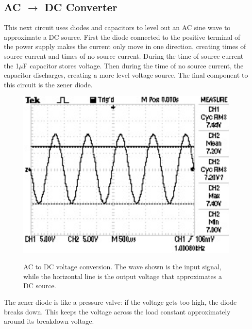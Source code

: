 \documentclass[twocolumn,english]{IEEEtran}
\begin{document}
\noindent\hrulefill
\subsection{\textbf{AC $\rightarrow$ DC Converter}}
This next circuit uses diodes and capacitors to level out an AC sine wave to approximate a DC source. First the diode connected to the positive terminal of the power supply makes the current only move in one direction, creating times of source current and times of no source current. During the time of source current the 1$\mu$F capacitor stores voltage. Then during the time of no source current, the capacitor discharges, creating a more level voltage source. The final component to this circuit is the zener diode.


\begin{figure}[h!]
  \begin{centering}
  \begin{center}
  \includegraphics[width=\linewidth]{./dcp.png}
  \label{fig:dcp}
  \caption{AC to DC voltage conversion. The wave shown is the input signal, while the horizontal line is the output voltage that approximates a DC source.}
  \end{center}
  \par\end{centering}
  \end{figure}
The zener diode is like a pressure valve: if the voltage gets too high, the diode breaks down. This keeps the voltage across the load constant approximately around its breakdown voltage.
\end{document}
